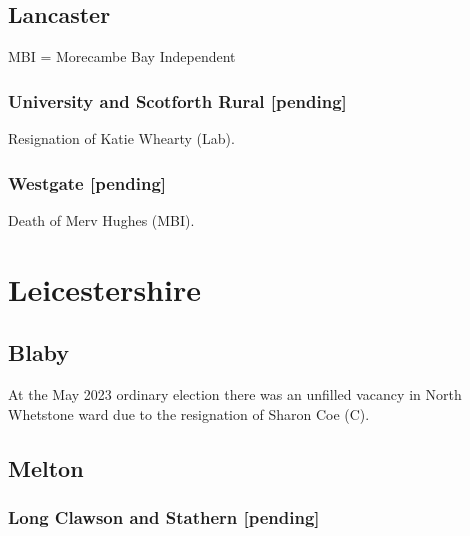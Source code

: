 \documentclass[a4paper,openany]{book}
\begin{document}
\begin{resultsiii}
\subsection*{Lancaster}

MBI = Morecambe Bay Independent

\subsubsection*{University and Scotforth Rural \hspace*{\fill}\nolinebreak[1]%
	\enspace\hspace*{\fill}
	[pending]}


Resignation of Katie Whearty (Lab).

\subsubsection*{Westgate \hspace*{\fill}\nolinebreak[1]%
	\enspace\hspace*{\fill}
	[pending]}


Death of Merv Hughes (MBI).

\section{Leicestershire}

\subsection*{Blaby}

At the May 2023 ordinary election there was an unfilled vacancy in North Whetstone ward due to the resignation of Sharon Coe (C).%

\subsection*{Melton}

\subsubsection*{Long Clawson and Stathern \hspace*{\fill}\nolinebreak[1]%
	\enspace\hspace*{\fill}
	[pending]}


\end{resultsiii}
\end{document}
